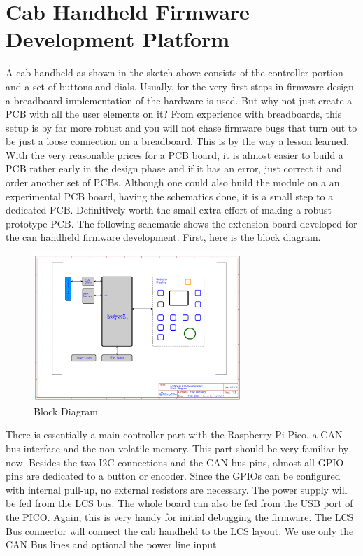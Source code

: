 \chapter{Cab Handheld Firmware Development Platform}

A cab handheld as shown in the sketch above consists of the controller portion and a set of buttons and dials. Usually, for the very first steps in firmware design a breadboard implementation of the hardware is used. But why not just create a PCB with all the user elements on it? From experience with breadboards, this setup is by far more robust and you will not chase firmware bugs that turn out to be just a loose connection on a breadboard. This is by the way a lesson learned. With the very reasonable prices for a PCB board, it is almost easier to build a PCB rather early in the design phase and if it has an error, just correct it and order another set of PCBs. Although one could also build the module on a an experimental PCB board, having the schematics done, it is a small step to a dedicated PCB. Definitively worth the small extra effort of making a robust prototype PCB. The following schematic shows the extension board developed for the can handheld firmware development. First, here is the block diagram.

\begin{figure}[htbp]
    \centering
    \includegraphics[page=1, width=0.7\textwidth]{./Schematics/Schematic_LcsNodes-Cab-Dev.pdf}
    \caption{Block Diagram}
\end{figure}
\FloatBarrier

There is essentially a main controller part with the Raspberry Pi Pico, a CAN bus interface and the non-volatile memory. This part should be very familiar by now. Besides the two I2C connections and the CAN bus pins, almost all GPIO pins are dedicated to a button or encoder. Since the GPIOs can be configured with internal pull-up, no external resistors are necessary. The power supply will be fed from the LCS bus. The whole board can also be fed from the USB port of the PICO. Again, this is very handy for initial debugging the firmware. The LCS Bus connector will connect the cab handheld to the LCS layout. We use only the CAN Bus lines and optional the power line input.

